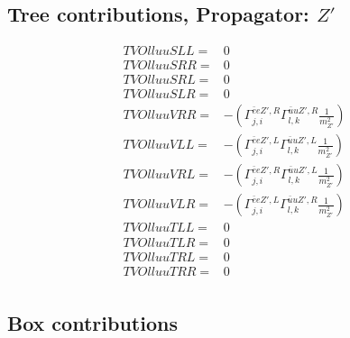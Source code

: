 \documentclass[A4,landscape]{article}
\begin{document}
\subsection{Tree contributions, Propagator: ${Z'}$} 

\begin{align} 
  TVOlluuSLL= & 0 \\ 
  TVOlluuSRR= & 0 \\ 
  TVOlluuSRL= & 0 \\ 
  TVOlluuSLR= & 0 \\ 
  TVOlluuVRR= & -(\Gamma^{\bar{e}e {Z'} ,R}_{j, i} \Gamma^{\bar{u}u {Z'} ,R}_{l, k} \frac{1}{m^2_{{Z'}}}) \\ 
  TVOlluuVLL= & -(\Gamma^{\bar{e}e {Z'} ,L}_{j, i} \Gamma^{\bar{u}u {Z'} ,L}_{l, k} \frac{1}{m^2_{{Z'}}}) \\ 
  TVOlluuVRL= & -(\Gamma^{\bar{e}e {Z'} ,R}_{j, i} \Gamma^{\bar{u}u {Z'} ,L}_{l, k} \frac{1}{m^2_{{Z'}}}) \\ 
  TVOlluuVLR= & -(\Gamma^{\bar{e}e {Z'} ,L}_{j, i} \Gamma^{\bar{u}u {Z'} ,R}_{l, k} \frac{1}{m^2_{{Z'}}}) \\ 
  TVOlluuTLL= & 0 \\ 
  TVOlluuTLR= & 0 \\ 
  TVOlluuTRL= & 0 \\ 
  TVOlluuTRR= & 0 \\ 
\end{align} 
\subsection{Box contributions} 
\end{document}

